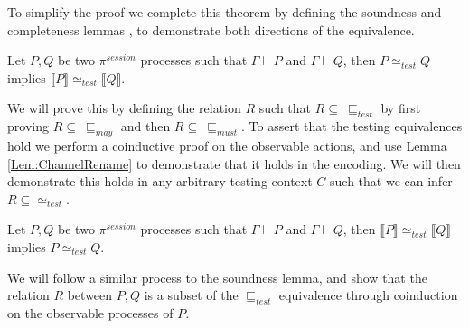 To simplify the proof we complete this theorem by defining the soundness and completeness lemmas \cite{DBLP:journals/mscs/GorlaN16fullabsmyths}, to demonstrate both directions of the equivalence.
\vspace{10pt}
\begin{lemma}[Completeness]
    Let $P, Q$ be two $\pi^{session}$ processes such that $\Gamma \vdash P$ and $\Gamma \vdash Q$, then $P \simeq_{test} Q$ implies $\llbracket P \rrbracket \simeq_{test} \llbracket Q \rrbracket$.
    \label{Lem:Soundess}
\end{lemma}
\vspace{10pt}
We will prove this by defining the relation $R$ such that $R \subseteq \: \sqsubseteq_{test}$ by first proving $R \subseteq \: \sqsubseteq_{may}$ and then $R \subseteq \: \sqsubseteq_{must}$. To assert that the testing equivalences hold we perform a coinductive proof on the observable actions, and use Lemma \ref{Lem:ChannelRename} to demonstrate that it holds in the encoding. We will then demonstrate this holds in any arbitrary testing context $C$ such that we can infer $R \subseteq \simeq_{test}$. 
\vspace{10pt}
\begin{lemma}[Soundness]
    Let $P, Q$ be two $\pi^{session}$ processes such that $\Gamma \vdash P$ and $\Gamma \vdash Q$, then $\llbracket P \rrbracket \simeq_{test} \llbracket Q \rrbracket$ implies $P \simeq_{test} Q$.
    \label{Lem:Completeness}
\end{lemma}
\vspace{10pt}
We will follow a similar process to the soundness lemma, and show that the relation $R$ between $P, Q$ is a subset of the $\sqsubseteq_{test}$ equivalence through coinduction on the observable processes of $P$. 

